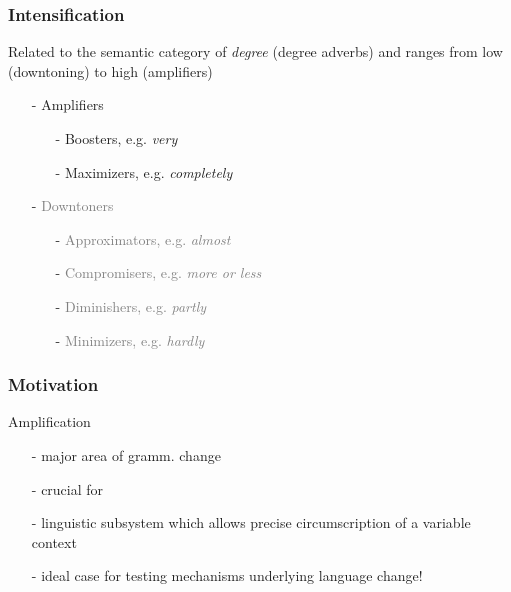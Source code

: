 \documentclass[12pt, table]{beamer}
\begin{document}
\begin{frame}
\frametitle{Intensification}
Related to the semantic category of \textit{degree} (degree adverbs) and ranges from low (downtoning) to high (amplifiers) \\
\begin{scriptsize}
\textcolor{gray}{\citep[589--590]{quirk1985comprehensive}}
\end{scriptsize}
\begin{itemize}
\item[-] Amplifiers
\begin{itemize}
\item[-] Boosters, e.g. \textit{very}
\item[-] Maximizers, e.g. \textit{completely}
\end{itemize}
\item[-] \textcolor{gray}{Downtoners}
\begin{itemize}
\item[-] \textcolor{gray}{Approximators, e.g. \textit{almost}}
\item[-] \textcolor{gray}{Compromisers, e.g. \textit{more or less}}
\item[-] \textcolor{gray}{Diminishers, e.g. \textit{partly}}
\item[-] \textcolor{gray}{Minimizers, e.g. \textit{hardly}}
\end{itemize} 
\end{itemize}
\end{frame}

\begin{frame}
\frametitle{Motivation}
Amplification
\begin{itemize}
\item[-] major area of gramm. change \textcolor{gray}{\begin{scriptsize}\citep[cf.][441]{brinton2006englishlanguage}\end{scriptsize}}
\item[-] crucial for  \textcolor{gray}{\begin{scriptsize}\citep[258]{ito2003well}\end{scriptsize}}
\item[-] linguistic subsystem which allows precise circumscription of a variable context \textcolor{gray}{\begin{scriptsize}\citep[49]{labov1972sociolinguistic, labov1966social}\end{scriptsize}}
\item[-] ideal case for testing mechanisms underlying language change!
\end{itemize}
\end{frame}
\end{document}
